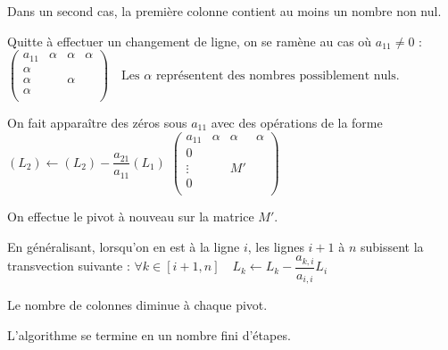 Dans un second cas, la première colonne contient au moins un nombre non nul.

 Quitte à effectuer un changement de ligne, on se ramène au cas où $a_{11}\neq 0$ :
 $
 \left(
 \begin{array}{c|ccc}
 a_{11} & \alpha & \alpha & \alpha \\
\hline
\alpha  & & & \\
\alpha  & & \alpha & \\
\alpha  & & & \\
\end{array}
 \right) \quad 
 \text{Les } \alpha \text{ représentent des nombres possiblement nuls.}
 $ 

 On fait apparaître des zéros sous $a_{11}$ avec des opérations de la forme $(L_2)\leftarrow (L_2)-\dfrac{a_{21}}{a_{11}}(L_1)$ 
 $
 \left(
 \begin{array}{c|ccc}
 a_{11} & \alpha & \alpha & \alpha \\
\hline
0  & & & \\
\vdots  & & M'& \\
0  & & & \\
\end{array}
 \right) 
 $ 
 
 On effectue le pivot  à nouveau sur la matrice $M'$.
 
 En généralisant, lorsqu'on en est à la ligne $i$, les lignes $i+1$ à $n$ subissent la transvection suivante : 
 $
 \forall k \in[i+1,n] \quad L_{k}\leftarrow L_k - \dfrac{a_{k,i}}{a_{i,i}}L_i
 $
 
 \begin{remarques}
 Le nombre de colonnes diminue à chaque pivot.
 
 L'algorithme se termine en un nombre fini d'étapes.
 \end{remarques}


